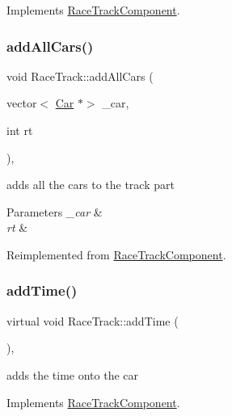 Implements \mbox{\hyperlink{class_race_track_component_af89a6b453dfd3fb39fce27576012106f}{Race\+Track\+Component}}.

\mbox{\label{class_race_track_a14ac008331e0a8945fce4cdb59086ba1}} 
\subsubsection{\texorpdfstring{add\+All\+Cars()}{addAllCars()}}
{\footnotesize\ttfamily void Race\+Track\+::add\+All\+Cars (\begin{DoxyParamCaption}\item[{vector$<$ \mbox{\hyperlink{class_car}{Car}} $\ast$$>$}]{\+\_\+car,  }\item[{int}]{rt }\end{DoxyParamCaption})\hspace{0.3cm}{\ttfamily [inline]}, {\ttfamily [virtual]}}

adds all the cars to the track part 
\begin{DoxyParams}{Parameters}
{\em \+\_\+car} & \\
\hline
{\em rt} & \\
\hline
\end{DoxyParams}


Reimplemented from \mbox{\hyperlink{class_race_track_component_afb51617f25b639cf0a98a42a86120937}{Race\+Track\+Component}}.

\mbox{\label{class_race_track_a9030a93ab510a49131fcbf1853d2fe81}} 
\subsubsection{\texorpdfstring{add\+Time()}{addTime()}}
{\footnotesize\ttfamily virtual void Race\+Track\+::add\+Time (\begin{DoxyParamCaption}{ }\end{DoxyParamCaption})\hspace{0.3cm}{\ttfamily [inline]}, {\ttfamily [virtual]}}

adds the time onto the car 

Implements \mbox{\hyperlink{class_race_track_component_aa815404c45ba7df3786c3add177eb7e6}{Race\+Track\+Component}}.

